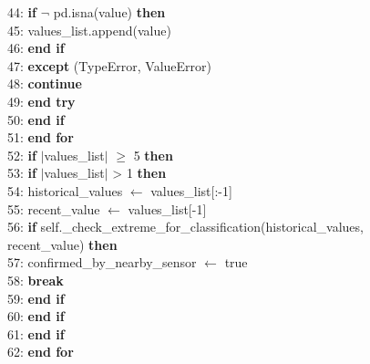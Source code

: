 \begin{breakablealgorithm}
\begin{flushleft}
44: \hspace{4em} \textbf{if} $\lnot$ pd.isna(value) \textbf{then} \\
45: \hspace{4.5em} values\_list.append(value) \\
46: \hspace{4em} \textbf{end if} \\
47: \hspace{3.5em} \textbf{except} (TypeError, ValueError) \\
48: \hspace{4em} \textbf{continue} \\
49: \hspace{3.5em} \textbf{end try} \\
50: \hspace{3em} \textbf{end if} \\
51: \hspace{2.5em} \textbf{end for} \\
52: \hspace{2.5em} \textbf{if} $|$values\_list$|$ $\geq$ 5 \textbf{then} \\
53: \hspace{3em} \textbf{if} $|$values\_list$|$ > 1 \textbf{then} \\
54: \hspace{3.5em} historical\_values $\gets$ values\_list[:-1] \\
55: \hspace{3.5em} recent\_value $\gets$ values\_list[-1] \\
56: \hspace{3.5em} \textbf{if} self.\_check\_extreme\_for\_classification(historical\_values, \\
\hspace{4em} recent\_value) \textbf{then} \\
57: \hspace{4em} confirmed\_by\_nearby\_sensor $\gets$ true \\
58: \hspace{4em} \textbf{break} \\
59: \hspace{3.5em} \textbf{end if} \\
60: \hspace{3em} \textbf{end if} \\
61: \hspace{2.5em} \textbf{end if} \\
62: \hspace{2em} \textbf{end for} \\

\end{flushleft}
\end{breakablealgorithm}
